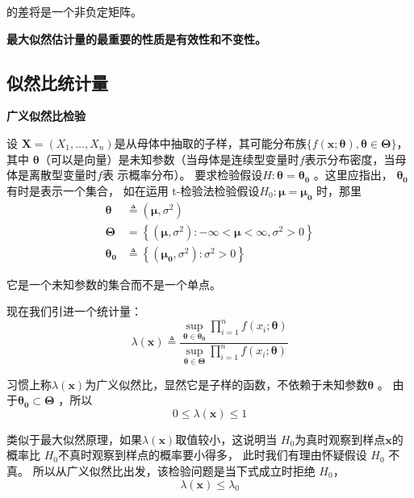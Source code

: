     的差将是一个非负定矩阵。
    
    {\bf 最大似然估计量的最重要的性质是有效性和不变性。 }

\subsection{似然比统计量}
{\bf 广义似然比检验}

 设 $ \boldsymbol{X} = (X_{1},\ldots,X_{n}) $是从母体中抽取的子样，其可能分布族$ \{f(\boldsymbol{x ; \theta}), \boldsymbol{\theta \in \Theta}\} $，
 其中 $ \boldsymbol{\theta} $（可以是向量）是未知参数（当母体是连续型变量时$ f $表示分布密度，当母体是离散型变量时$ f $表 示概率分布）。
 要求检验假设$ H: \boldsymbol{\theta=\theta_{0}} $ 。这里应指出， $ \boldsymbol{\theta_{0}}$ 有时是表示一个集合，
 如在运用 t-检验法检验假设$ H_{0}: \boldsymbol{\mu=\mu_{0}}$ 时，那里
 $$ \begin{aligned}
    \boldsymbol{\theta}  & \triangleq \left(\boldsymbol{\mu}, \sigma^{2}\right) \\
    \boldsymbol{\Theta} & = \left\{\left(\boldsymbol{\mu}, \sigma^{2}\right):-\infty<\boldsymbol{\mu }<\infty, \sigma^{2}>0\right\} \\
    \boldsymbol{\theta_{0}}  &\triangleq \left\{\left(\boldsymbol{\mu_{0}}, \sigma^{2}\right): \sigma^{2}>0\right\}
    \end{aligned} $$

    它是一个未知参数的集合而不是一个单点。

    现在我们引进一个统计量：
    $$ \lambda(\boldsymbol{x}) \triangleq \frac{\sup _{\boldsymbol{\theta \in \theta_{0}}} \prod_{i=1}^{n} f\left(x_{i} ; \boldsymbol{\theta} \right)}
                {\sup_{ \boldsymbol{\theta \in \Theta} } \prod_{i=1}^{n} f \left(x_{i} ; \boldsymbol{\theta}\right)} $$

    习惯上称$ \lambda(\boldsymbol{x}) $为广义似然比，显然它是子样的函数，不依赖于未知参数$ \boldsymbol{\theta} $ 。
    由于$ \boldsymbol{\theta_{0}} \subset \boldsymbol{\Theta} $ ，所以
    $$ 0 \leqslant \lambda(\boldsymbol{x}) \leqslant 1 $$

    类似于最大似然原理，如果$ \lambda(\boldsymbol{x}) $取值较小，这说明当 $ H_{0} $为真时观察到样点$ \boldsymbol{x} $的概率比 $ H_0$不真时观察到样点的概率要小得多，
    此时我们有理由怀疑假设 $ H_{0} $ 不真。
    所以从广义似然比出发，该检验问题是当下式成立时拒绝 $ H_{0} $，
    \begin{equation}
        \lambda(\boldsymbol{x}) \leqslant {\lambda_{0}}
    \end{equation}

